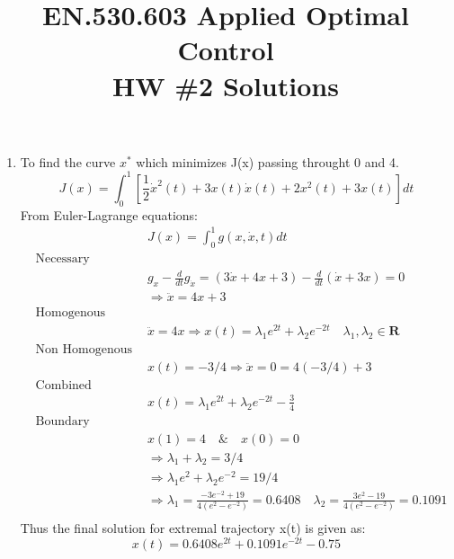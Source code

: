 
\title{EN.530.603 Applied Optimal Control \\HW \#2 Solutions}
\graphicspath{{./figures/}}

\maketitle

\begin{enumerate}

  \item To find the curve $x^*$ which minimizes J(x) passing throught 0 and 4.
  \begin{equation}
   J(x) = \int_0^1 \left[ \frac{1}{2} {\dot x}^2(t) + 3 x(t) \dot x(t) +2x^2(t) + 3x(t)\right]dt
  \end{equation}
  From Euler-Lagrange equations:
  \begin{align*}
   &&J(x) = \int_0^1 g(x,\dot x,t) dt \\
    &\text{Necessary Conditions}& \\
  &&g_x - \frac{d}{dt} g_{\dot x}  = (3 \dot x + 4x + 3) - \frac{d}{dt}(\dot x + 3x) = 0\\
   &&\Rightarrow \ddot x = 4x + 3 \\ 
   &\text{Homogenous solution:}&\\
   &&\ddot x = 4x \Rightarrow x(t) = \lambda_1 e^{2t} + \lambda_2 e^{-2t} \quad \lambda_1 , \lambda_2 \in \mathbf{R} \\
   &\text{Non Homogenous solution:}&\\
   &&x(t) = -3/4 \Rightarrow \ddot x = 0 = 4 ( -3/4) +3\\
   &\text{Combined Solution:}&\\
   && x(t) =  \lambda_1 e^{2t} + \lambda_2 e^{-2t} - \frac{3}{4} \\
   &\text{Boundary Conditions:}& \\
   &&x(1) = 4 \quad \& \quad x(0) = 0\\
   &&\Rightarrow \lambda_1 + \lambda_2 = 3/4\\
   &&\Rightarrow \lambda_1 e^2 + \lambda_2 e^{-2} = 19/4\\
   && \Rightarrow \lambda_1 = \frac{-3 e^{-2} + 19}{4(e^2 - e^{-2})} = 0.6408\quad \lambda_2 = \frac{3 e^{2} - 19}{4(e^2 - e^{-2})} = 0.1091 \\ 
  \end{align*}
  Thus the final solution for extremal trajectory x(t) is given as:
  \begin{equation*}
   x(t) = 0.6408e^{2t} + 0.1091 e^{-2t} - 0.75
  \end{equation*}


\end{enumerate}
